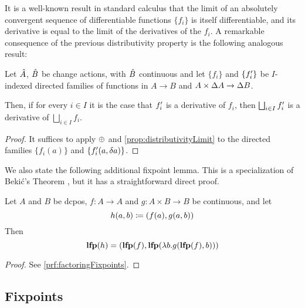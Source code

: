 It is a well-known result in standard calculus that the limit of an absolutely convergent sequence of
differentiable functions $\{f_i\}$ is itself differentiable, and its derivative is equal to the limit
of the derivatives of the $f_i$. A remarkable consequence of the previous distributivity property
is the following analogous result:

\begin{corollary}
  \label{cor:diffContinuous}
  Let $\hat{A}$, $\hat{B}$ be change actions, with $\hat{B}$ continuous and let $\{f_i\}$ and $\{f_i'\}$ be
  $I$-indexed directed families of functions in $A \rightarrow B$ and $A \times \Delta A \rightarrow \Delta B$.

  Then, if for every $i \in I$ it is the case that $f_i'$ is a derivative of $f_i$, then $\bigsqcup_{i \in I} f_i'$ is
  a derivative of $\bigsqcup_{i \in I} f_i $.
\end{corollary}
\ifproofs
\begin{proof}
  It suffices to apply $\oplus$ and \cref{prop:distributivityLimit} to the directed families $\{ f_i(a) \}$ and
  $\{ f_i'(a, \delta a) \}$.
\end{proof}
\fi

We also state the following additional fixpoint lemma. This is a specialization of
Beki\'c's Theorem \autocite[][section 10.1]{winskel1993formal}, but it has a straightforward direct proof.

\begin{prop}[name=Factoring of fixpoints, restate=factoringFixpoints]
  \label{prop:factoringFixpoints}
  Let $A$ and $B$ be dcpos, $f : A \rightarrow A$ and $g: A \times B \rightarrow B$ be continuous, and let
  \begin{displaymath}
    h(a, b) \coloneqq (f(a), g(a, b))
  \end{displaymath}
  Then
  \begin{displaymath}
    \mathbf{lfp}(h) = (\mathbf{lfp}(f), \mathbf{lfp}(\lambda b . g(\mathbf{lfp}(f), b)))
  \end{displaymath}
\end{prop}
\ifproofs
\begin{proof}
  See \cref{prf:factoringFixpoints}.
\end{proof}
\fi

\subsection{Fixpoints}
\label{sec:fixpoints}

